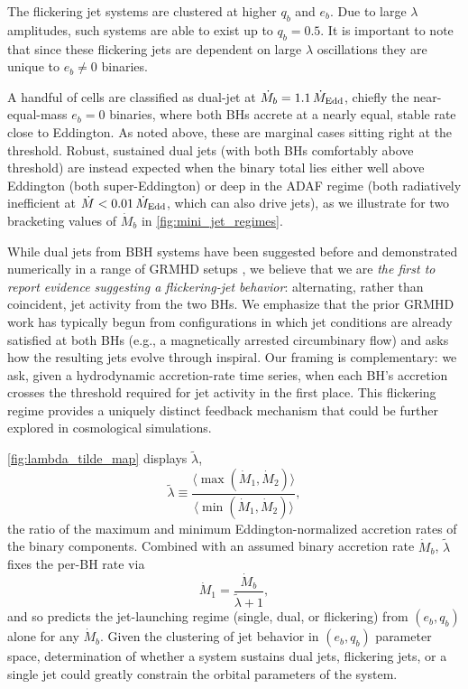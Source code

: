 \documentclass[fleqn,usenatbib]{mnras}
\begin{document}
The flickering jet systems are clustered at higher $q_b$ and $e_b$. Due to large $\lambda$ amplitudes, such systems are able to exist up to $q_b=0.5$. It is important to note that since these flickering jets are dependent on large $\lambda$ oscillations they are unique to $e_b \neq 0$ binaries.

A handful of cells are classified as dual-jet at $\dot{M}_b = 1.1\,\dot{M}_{\rm Edd}$, chiefly the near-equal-mass $e_b = 0$ binaries, where both BHs accrete at a nearly equal, stable rate close to Eddington. As noted above, these are marginal cases sitting right at the threshold. Robust, sustained dual jets (with both BHs comfortably above threshold) are instead expected when the binary total lies either well above Eddington (both super-Eddington) or deep in the ADAF regime (both radiatively inefficient at $\dot{M} < 0.01\,\dot{M}_{\rm Edd}$, which can also drive jets), as we illustrate for two bracketing values of $\dot{M}_b$ in \autoref{fig:mini_jet_regimes}.

While dual jets from BBH systems have been suggested before \citep{Palenzuela_dualjet_10, Qian_dualjet_19} and demonstrated numerically in a range of GRMHD setups \citep{Gutierrez_24, Ressler_dualjet_25, Ruiz_Shapiro_23, Most_Wang_24, Ennoggi_25}, we believe that we are \textit{the first to report evidence suggesting a flickering-jet behavior}: alternating, rather than coincident, jet activity from the two BHs. We emphasize that the prior GRMHD work has typically begun from configurations in which jet conditions are already satisfied at both BHs (e.g., a magnetically arrested circumbinary flow) and asks how the resulting jets evolve through inspiral. Our framing is complementary: we ask, given a hydrodynamic accretion-rate time series, when each BH's accretion crosses the threshold required for jet activity in the first place. This flickering regime provides a uniquely distinct feedback mechanism that could be further explored in cosmological simulations.

\autoref{fig:lambda_tilde_map} displays $\tilde{\lambda}$,
\begin{equation}
    \tilde{\lambda} \equiv \frac{\langle \max (\dot{M}_{1}, \dot{M}_{2}) \rangle }{\langle \min (\dot{M}_{1}, \dot{M}_{2}) \rangle},
\end{equation}
the ratio of the maximum and minimum Eddington-normalized accretion rates of the binary components. Combined with an assumed binary accretion rate $\dot{M}_b$, $\tilde{\lambda}$ fixes the per-BH rate via
\begin{equation}
    \dot{M}_1 = \frac{\dot{M}_b}{\tilde{\lambda} + 1},
\end{equation}
and so predicts the jet-launching regime (single, dual, or flickering) from $(e_b, q_b)$ alone for any $\dot{M}_b$. Given the clustering of jet behavior in $(e_b, q_b)$ parameter space, determination of whether a system sustains dual jets, flickering jets, or a single jet could greatly constrain the orbital parameters of the system.
\end{document}
